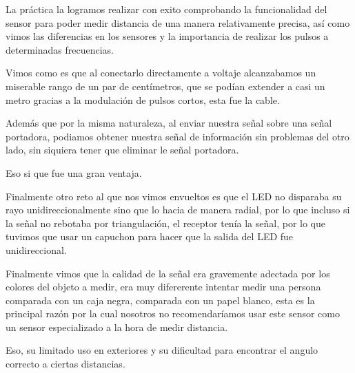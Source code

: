 \documentclass[12pt, fleqn]{article}                            %
\theoremstyle{break}                                            %
\begin{document}
        La práctica la logramos realizar con exito comprobando la funcionalidad del sensor
        para poder medir distancia de una manera relativamente precisa, así como vimos
        las diferencias en los sensores y la importancia de realizar los pulsos a determinadas
        frecuencias.

        Vimos como es que al conectarlo directamente a voltaje alcanzabamos un miserable rango de un par de
        centímetros, que se podían extender a casi un metro gracias a la modulación de pulsos cortos, esta
        fue la cable.

        Además que por la misma naturaleza, al enviar nuestra señal sobre una señal portadora, podiamos obtener
        nuestra señal de información sin problemas del otro lado, sin siquiera tener que eliminar le señal portadora.

        Eso si que fue una gran ventaja.

        Finalmente otro reto al que nos vimos envueltos es que el LED no disparaba su rayo unidireccionalmente
        sino que lo hacia de manera radial, por lo que incluso si la señal no rebotaba por triangulación, el receptor
        tenía la señal, por lo que tuvimos que usar un capuchon para hacer que la salida del LED fue unidireccional.

        Finalmente vimos que la calidad de la señal era gravemente adectada por los colores del objeto a medir, era muy
        difererente intentar medir una persona comparada con un caja negra, comparada con un papel blanco, esta es la
        principal razón por la cual nosotros no recomendaríamos usar este sensor como un sensor especializado a la hora de
        medir distancia.

        Eso, su limitado uso en exteriores y su dificultad para encontrar el angulo correcto a ciertas distancias.
\end{document}

